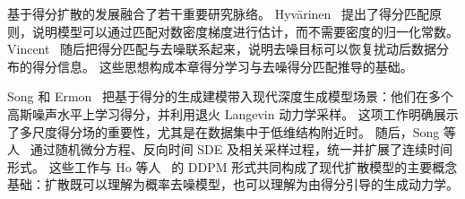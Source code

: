 基于得分扩散的发展融合了若干重要研究脉络。
Hyv\"arinen~\cite{hyvarinen2005estimation} 提出了得分匹配原则，说明模型可以通过匹配对数密度梯度进行估计，而不需要密度的归一化常数。
Vincent~\cite{vincent2011connection} 随后把得分匹配与去噪联系起来，说明去噪目标可以恢复扰动后数据分布的得分信息。
这些思想构成本章得分学习与去噪得分匹配推导的基础。

Song 和 Ermon~\cite{song2019generative} 把基于得分的生成建模带入现代深度生成模型场景：他们在多个高斯噪声水平上学习得分，并利用退火 Langevin 动力学采样。
这项工作明确展示了多尺度得分场的重要性，尤其是在数据集中于低维结构附近时。
随后，Song 等人~\cite{song2021scorebased} 通过随机微分方程、反向时间 SDE 及相关采样过程，统一并扩展了连续时间形式。
这些工作与 Ho 等人~\cite{ho2020denoising} 的 DDPM 形式共同构成了现代扩散模型的主要概念基础：扩散既可以理解为概率去噪模型，也可以理解为由得分引导的生成动力学。
